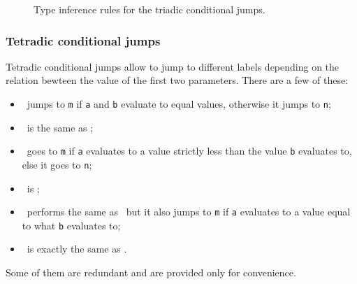 \begin{figure}[H]
	\centering


	\caption{Type inference rules for the triadic conditional jumps.}
	\label{fig:nstar-instructionset-terminal-cjX-triadic-typerules}
\end{figure}

\subsubsection{Tetradic conditional jumps}\label{subsubsec:nstar-instructionset-terminal-cjX-tetradic}

Tetradic conditional jumps allow to jump to different labels depending on the relation bewteen the value of the first two parameters.
There are a few of these:
\begin{itemize}
	\item {}\ jumps to \texttt{m} if \texttt{a} and \texttt{b} evaluate to equal values, otherwise it jumps to \texttt{n};
	\item {}\ is the same as ;
	\item {}\ goes to \texttt{m} if \texttt{a} evaluates to a value strictly less than the value \texttt{b} evaluates to, else it goes to \texttt{n};
	\item {}\ is ;
	\item {}\ performs the same as \ but it also jumps to \texttt{m} if \texttt{a} evaluates to a value equal to what \texttt{b} evaluates to;
	\item {}\ is exactly the same as .
\end{itemize}
Some of them are redundant and are provided only for convenience.

